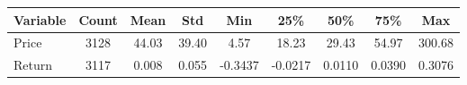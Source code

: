\documentclass[12pt]{article}
\begin{document}
\begin{singlespace}
\begin{table}[H]
\centering
\footnotesize
\begin{tabular}{lcccccccc}
\toprule
\textbf{Variable} & \textbf{Count} & \textbf{Mean} & \textbf{Std} & \textbf{Min} & \textbf{25\%} & \textbf{50\%} & \textbf{75\%} & \textbf{Max} \\
\midrule
Price & 3128 & 44.03 & 39.40 & 4.57 & 18.23 & 29.43 & 54.97 & 300.68 \\
Return & 3117 & 0.008 & 0.055 & -0.3437 & -0.0217 & 0.0110 & 0.0390 & 0.3076 \\
\bottomrule
\end{tabular}
\end{table}
\end{singlespace}
\end{document}
